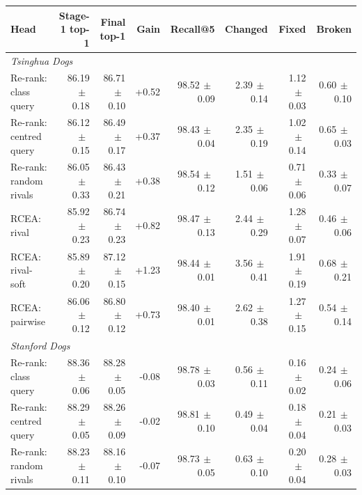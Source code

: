 \begin{tabular}{lrrrrrrr}
\toprule
Head & Stage-1 top-1 & Final top-1 & Gain & Recall@5 & Changed & Fixed & Broken \\
\midrule
\multicolumn{8}{l}{\emph{Tsinghua Dogs}} \\
Re-rank: class query & 86.19{\scriptsize$\,\pm\,$0.18} & 86.71{\scriptsize$\,\pm\,$0.10} & +0.52 & 98.52{\scriptsize$\,\pm\,$0.09} & 2.39{\scriptsize$\,\pm\,$0.14} & 1.12{\scriptsize$\,\pm\,$0.03} & 0.60{\scriptsize$\,\pm\,$0.10} \\
Re-rank: centred query & 86.12{\scriptsize$\,\pm\,$0.15} & 86.49{\scriptsize$\,\pm\,$0.17} & +0.37 & 98.43{\scriptsize$\,\pm\,$0.04} & 2.35{\scriptsize$\,\pm\,$0.19} & 1.02{\scriptsize$\,\pm\,$0.14} & 0.65{\scriptsize$\,\pm\,$0.03} \\
Re-rank: random rivals & 86.05{\scriptsize$\,\pm\,$0.33} & 86.43{\scriptsize$\,\pm\,$0.21} & +0.38 & 98.54{\scriptsize$\,\pm\,$0.12} & 1.51{\scriptsize$\,\pm\,$0.06} & 0.71{\scriptsize$\,\pm\,$0.06} & 0.33{\scriptsize$\,\pm\,$0.07} \\
RCEA: rival & 85.92{\scriptsize$\,\pm\,$0.23} & 86.74{\scriptsize$\,\pm\,$0.23} & +0.82 & 98.47{\scriptsize$\,\pm\,$0.13} & 2.44{\scriptsize$\,\pm\,$0.29} & 1.28{\scriptsize$\,\pm\,$0.07} & 0.46{\scriptsize$\,\pm\,$0.06} \\
RCEA: rival-soft & 85.89{\scriptsize$\,\pm\,$0.20} & 87.12{\scriptsize$\,\pm\,$0.15} & +1.23 & 98.44{\scriptsize$\,\pm\,$0.01} & 3.56{\scriptsize$\,\pm\,$0.41} & 1.91{\scriptsize$\,\pm\,$0.19} & 0.68{\scriptsize$\,\pm\,$0.21} \\
RCEA: pairwise & 86.06{\scriptsize$\,\pm\,$0.12} & 86.80{\scriptsize$\,\pm\,$0.12} & +0.73 & 98.40{\scriptsize$\,\pm\,$0.01} & 2.62{\scriptsize$\,\pm\,$0.38} & 1.27{\scriptsize$\,\pm\,$0.15} & 0.54{\scriptsize$\,\pm\,$0.14} \\
\multicolumn{8}{l}{\emph{Stanford Dogs}} \\
Re-rank: class query & 88.36{\scriptsize$\,\pm\,$0.06} & 88.28{\scriptsize$\,\pm\,$0.05} & -0.08 & 98.78{\scriptsize$\,\pm\,$0.03} & 0.56{\scriptsize$\,\pm\,$0.11} & 0.16{\scriptsize$\,\pm\,$0.02} & 0.24{\scriptsize$\,\pm\,$0.06} \\
Re-rank: centred query & 88.29{\scriptsize$\,\pm\,$0.05} & 88.26{\scriptsize$\,\pm\,$0.09} & -0.02 & 98.81{\scriptsize$\,\pm\,$0.10} & 0.49{\scriptsize$\,\pm\,$0.04} & 0.18{\scriptsize$\,\pm\,$0.04} & 0.21{\scriptsize$\,\pm\,$0.03} \\
Re-rank: random rivals & 88.23{\scriptsize$\,\pm\,$0.11} & 88.16{\scriptsize$\,\pm\,$0.10} & -0.07 & 98.73{\scriptsize$\,\pm\,$0.05} & 0.63{\scriptsize$\,\pm\,$0.10} & 0.20{\scriptsize$\,\pm\,$0.04} & 0.28{\scriptsize$\,\pm\,$0.03} \\

\end{tabular}
